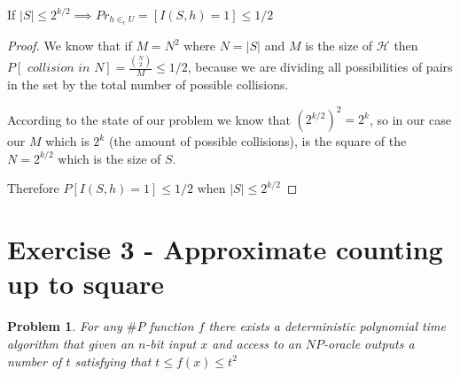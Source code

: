 \documentclass[12pt, a4paper]{article}
\begin{document}
\begin{2k}
  If $|S| \leq 2^{k/2} \implies Pr_{h \in_r U} = \left[ I(S,h) = 1 \right] \leq 1/2$
\end{2k}

\begin{proof}
  We know that if $M = N^2$ where $N = |S|$ and $M$ is the size of $\mathcal{H}$ then $P[\textit{ collision in } N] = \frac{\binom{N}{2}}{M} \leq 1/2$, because we are dividing all possibilities of pairs in the set by the total number of possible collisions.

 According to the state of our problem we know that $(2^{k/2})^2 = 2^k$, so in our case our $M$ which is $2^k$ (the amount of possible collisions), is the square of the $N = 2^{k/2}$ which is the size of $S$.

Therefore $P[I(S,h)=1] \leq 1/2$ when $|S| \leq 2^{k/2}$

\end{proof}

\section{Exercise 3 - Approximate counting up to square}
\newtheorem{a-counting}{Problem}
\begin{a-counting}
  For any $\#P$ function $f$ there exists a \textit{deterministic} polynomial time algorithm that given an $n$-bit input $x$ and access to an $NP$-oracle outputs a number of $t$ satisfying that $t \leq f(x) \leq t^2$
\end{a-counting}
\end{document}
